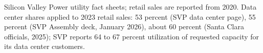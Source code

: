 \footnotesize Silicon Valley Power utility fact sheets; retail sales are reported from 2020. Data center shares applied to 2023 retail sales: 53 percent (SVP data center page), 55 percent (SVP Assembly deck, January 2026), about 60 percent (Santa Clara officials, 2025); SVP reports 64 to 67 percent utilization of requested capacity for its data center customers.